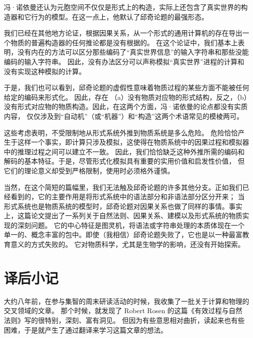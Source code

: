 \documentclass[a4paper,12pt]{article}
\begin{document}
冯·诺依曼还认为元胞空间不仅仅是形式上的构造，实际上还包含了真实世界的构造器和它行为的模型。在这一点上，他默认了邱奇论题的最强形态。

我们已经在其他地方\cite{RosenR1985}论证，根据因果关系，从一个形式的通用计算机的存在导出一个物质的普遍构造器的任何推论都是没有根据的。
在这个论证中，我们基本上表明，没有内在的方法可以区分那些编码了“真实世界信息”的输入字符串和那些没能编码的输入字符串。
因此，没有办法区分可以声称模拟“真实世界”进程的计算和没有实现这种模拟的计算。

于是，我们也可以看到，邱奇论题的虚假性意味着物质过程的某些方面不能被任何给定的编码来形式化。
因此，存在 （a）没有物质对应物的形式结构，反之，（b）没有形式对应物的物质构造。因此，在这两个方面，冯·诺依曼的论点都没有实质内容，
仅仅涉及到“自动机”（或“机器”）和“构造”这两个术语常见的模棱两可。

这些考虑表明，不受限制地从形式系统外推到物质系统是多么危险。
危险恰恰产生于这样一个事实，即计算只涉及模拟，这使得在物质系统中的因果过程和模拟器中的推理过程之间可以建立不一致。
因此，我们恰恰缺乏这种外推所需的编码和解码的基本特征。于是，尽管形式化模拟具有重要的实用价值和启发性价值，
但它们的理论意义却受到严格限制，使用时必须格外谨慎。

当然，在这个简短的篇幅里，我们无法触及邱奇论题的许多其他分支。正如我们已经看到的，它的主要作用是将形式系统中的语法部分和非语法部分区分开来；
当形式系统也是物质系统的模型时，邱奇论题对因果关系也做了同样的事情。事实上，这篇论文提出了一系列关于自然法则、因果关系、建模以及形式系统的物质实现的深刻问题。
它的中心特征是图灵机，将语法或字符串处理的本质体现在一个单一的、概念丰富的包中。即使（我相信）邱奇论题失败了，它也是以一种最富教育意义的方式失败的。
它对物质科学，尤其是生物学的影响，还没有开始探索。

\newpage
{}
{}



\newpage
{}
{}
\printindex
\printglossaries

\newpage
\appendix
\section{译后小记}

大约八年前，在参与集智的周末研读活动的时候，我收集了一批关于计算和物理的交叉领域的文章。
那个时候，就发现了 Robert Rosen 的这篇《有效过程与自然法则》写的很特别，深刻、富有洞见。
但因为有些意思相对曲折，读起来也有些困难，于是就产生了通过翻译来学习这篇文章的想法。
\end{document}
